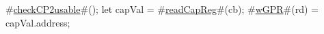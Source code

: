 #\hyperref[sailMIPSzcheckCP2usable]{checkCP2usable}#();
let capVal = #\hyperref[sailMIPSzreadCapReg]{readCapReg}#(cb);
#\hyperref[sailMIPSzwGPR]{wGPR}#(rd) = capVal.address;
